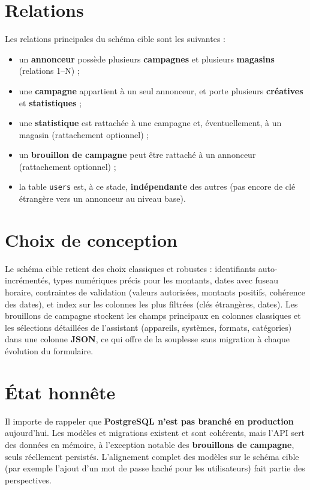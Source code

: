 \section{Relations}

Les relations principales du schéma cible sont les suivantes :

\begin{itemize}
  \item un \textbf{annonceur} possède plusieurs \textbf{campagnes} et
        plusieurs \textbf{magasins} (relations 1--N) ;
  \item une \textbf{campagne} appartient à un seul annonceur, et porte
        plusieurs \textbf{créatives} et \textbf{statistiques} ;
  \item une \textbf{statistique} est rattachée à une campagne et,
        éventuellement, à un magasin (rattachement optionnel) ;
  \item un \textbf{brouillon de campagne} peut être rattaché à un annonceur
        (rattachement optionnel) ;
  \item la table \texttt{users} est, à ce stade, \textbf{indépendante} des
        autres (pas encore de clé étrangère vers un annonceur au niveau base).
\end{itemize}

\section{Choix de conception}

Le schéma cible retient des choix classiques et robustes : identifiants
auto-incrémentés, types numériques précis pour les montants, dates avec fuseau
horaire, contraintes de validation (valeurs autorisées, montants positifs,
cohérence des dates), et index sur les colonnes les plus filtrées (clés
étrangères, dates). Les brouillons de campagne stockent les champs principaux
en colonnes classiques et les sélections détaillées de l'assistant (appareils,
systèmes, formats, catégories) dans une colonne \textbf{JSON}, ce qui offre de
la souplesse sans migration à chaque évolution du formulaire.

\section{État honnête}

Il importe de rappeler que \textbf{PostgreSQL n'est pas branché en production}
aujourd'hui. Les modèles et migrations existent et sont cohérents, mais l'API
sert des données en mémoire, à l'exception notable des \textbf{brouillons de
campagne}, seuls réellement persistés. L'alignement complet des modèles sur le
schéma cible (par exemple l'ajout d'un mot de passe haché pour les
utilisateurs) fait partie des perspectives.

